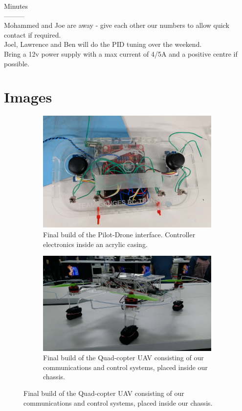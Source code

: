 \documentclass[a4paper,11pt]{article}
\begin{document}
Minutes\\
---------\\
Mohammed and Joe are away - give each other our numbers to allow quick contact if required.\\
Joel, Lawrence and Ben will do the PID tuning over the weekend.\\
Bring a 12v power supply with a max current of 4/5A and a positive centre if possible. \\
\newpage
\section{Images}
\begin{figure}[!htp]
\caption{Final product images}
    \begin{subfigure}{\textwidth}
    \includegraphics[width=0.9\linewidth]{remote.jpg} 
    \caption{Final build of the Pilot-Drone interface. Controller electronics inside an acrylic casing.}
    \label{fig:subim1}
    \end{subfigure}
    \begin{subfigure}{\textwidth}
    \includegraphics[width=0.9\linewidth]{drone.jpg}
    \caption{Final build of the Quad-copter UAV consisting of our communications and control systems, placed inside our chassis.}
    \label{fig:subim2}
    \end{subfigure}
    
    \label{fig:my_label}
\end{figure}
 \FloatBarrier
\end{document}
